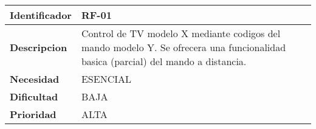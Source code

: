 \begin{center}
    \begin{tabular}{|p{2.6cm}|p{12cm}|}
    \hline
    \textbf{Identificador} & RF-01\\
    \hline
    \textbf{Descripcion} & Control de TV modelo X mediante codigos del mando modelo Y. Se ofrecera una funcionalidad basica (parcial) del mando a distancia.\\
    \hline
    \textbf{Necesidad} & ESENCIAL\\
    \hline
    \textbf{Dificultad} & BAJA\\
    \hline
    \textbf{Prioridad} & ALTA\\
    \hline
    \end{tabular}
\end{center}
